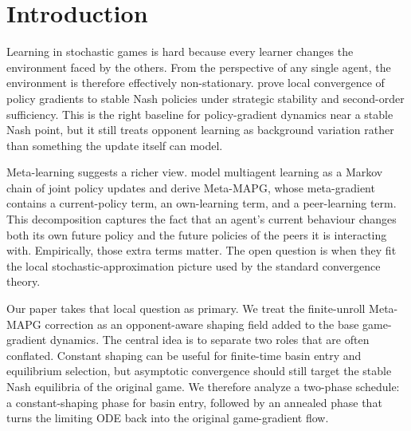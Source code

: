 \documentclass{article}
\theoremstyle{plain}
\theoremstyle{definition}
\theoremstyle{remark}
\begin{document}
\section{Introduction}

Learning in stochastic games is hard because every learner changes the environment faced by the others. From the perspective of any single agent, the environment is therefore effectively non-stationary. \citet{giannou2022convergence} prove local convergence of policy gradients to stable Nash policies under strategic stability and second-order sufficiency. This is the right baseline for policy-gradient dynamics near a stable Nash point, but it still treats opponent learning as background variation rather than something the update itself can model.

Meta-learning suggests a richer view. \citet{kim2021meta} model multiagent learning as a Markov chain of joint policy updates and derive Meta-MAPG, whose meta-gradient contains a current-policy term, an own-learning term, and a peer-learning term. This decomposition captures the fact that an agent's current behaviour changes both its own future policy and the future policies of the peers it is interacting with. Empirically, those extra terms matter. The open question is when they fit the local stochastic-approximation picture used by the standard convergence theory.

Our paper takes that local question as primary. We treat the finite-unroll Meta-MAPG correction as an opponent-aware shaping field added to the base game-gradient dynamics. The central idea is to separate two roles that are often conflated. Constant shaping can be useful for finite-time basin entry and equilibrium selection, but asymptotic convergence should still target the stable Nash equilibria of the original game. We therefore analyze a two-phase schedule: a constant-shaping phase for basin entry, followed by an annealed phase that turns the limiting ODE back into the original game-gradient flow.
\end{document}
